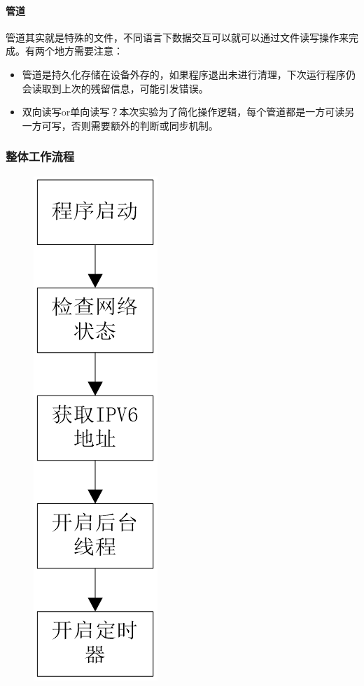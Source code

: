 \documentclass[paper=a4, fontsize=11pt, UTF8]{article} %
\begin{document}
\paragraph{管道}
管道其实就是特殊的文件，不同语言下数据交互可以就可以通过文件读写操作来完成。有两个地方需要注意：
\begin{itemize}
    \item 管道是持久化存储在设备外存的，如果程序退出未进行清理，下次运行程序仍会读取到上次的残留信息，可能引发错误。
    \item 双向读写or单向读写？本次实验为了简化操作逻辑，每个管道都是一方可读另一方可写，否则需要额外的判断或同步机制。
\end{itemize}

\subsubsection{整体工作流程}
\begin{figure}[H]
    \centering
    \includegraphics[scale=0.7]{photos/total.png}
\end{figure}
\end{document}
